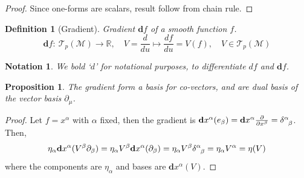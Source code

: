 \documentclass[a4paper]{article}
\newtheorem{notation}{Notation}[section]
\theoremstyle{new}
\newtheorem{defi}{Definition}[section]
\newtheorem{prop}{Proposition}[section]
\begin{document}
\begin{proof}
Since one-forms are scalars, result follow from chain rule.
\end{proof}
\begin{defi}[Gradient]
Gradient $\mathbf{d}f$ of a smooth function $f$.
$$\mathbf{d}f:~\mathcal{T}_p(\mathcal{M})\rightarrow\mathbb{R},\quad V=\frac{d}{du}\mapsto\frac{df}{du}=V(f),\quad V\in \mathcal{T}_p(\mathcal{M})$$
\end{defi}
\begin{notation}
We bold `$d$' for notational purposes, to differentiate $df$ and $\mathbf{d}f$.
\end{notation}
\begin{prop}
The gradient form a basis for co-vectors, and are dual basis of the vector basis $\partial_\mu$. 
\end{prop}
\begin{proof}
Let $f=x^\alpha$ with $\alpha$ fixed, then the gradient is $\mathbf{d}x^\alpha(e_\beta)=\mathbf{d}x^\alpha\frac{\partial}{\partial x^\beta}=\tensor*{\delta}{*_{}^{\alpha}_{\beta}}$. Then,
\begin{equation}
\eta_\alpha\mathbf{d}x^\alpha(V^\beta\partial_\beta)=\eta_\alpha V^\beta\mathbf{d}x^\alpha(\partial_\beta)=\eta_\alpha V^\beta\tensor*{\delta}{*_{}^{\alpha}_{\beta}}=\eta_\alpha V^\alpha=\eta(V)\label{one-form}
\end{equation}
where the components are $\eta_\alpha$ and bases are $\mathbf{d}x^\alpha(V)$.
\end{proof}
\end{document}
